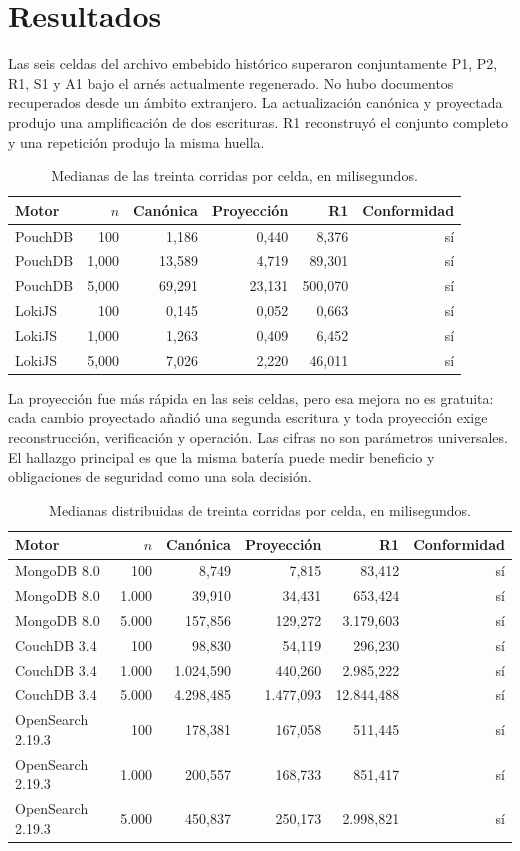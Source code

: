\documentclass[11pt]{article}
\begin{document}
\section{Resultados}
Las seis celdas del archivo embebido histórico superaron conjuntamente P1, P2, R1, S1 y A1 bajo el arnés actualmente regenerado. No hubo documentos recuperados desde un ámbito extranjero. La actualización canónica y proyectada produjo una amplificación de dos escrituras. R1 reconstruyó el conjunto completo y una repetición produjo la misma huella.

\begin{table}[h]
\centering
\caption{Medianas de las treinta corridas por celda, en milisegundos.}
\begin{tabular}{lrrrrr}
\toprule Motor & $n$ & Canónica & Proyección & R1 & Conformidad\\ \midrule
PouchDB & 100 & 1,186 & 0,440 & 8,376 & sí\\
PouchDB & 1,000 & 13,589 & 4,719 & 89,301 & sí\\
PouchDB & 5,000 & 69,291 & 23,131 & 500,070 & sí\\
LokiJS & 100 & 0,145 & 0,052 & 0,663 & sí\\
LokiJS & 1,000 & 1,263 & 0,409 & 6,452 & sí\\
LokiJS & 5,000 & 7,026 & 2,220 & 46,011 & sí\\ \bottomrule
\end{tabular}
\end{table}

La proyección fue más rápida en las seis celdas, pero esa mejora no es gratuita: cada cambio proyectado añadió una segunda escritura y toda proyección exige reconstrucción, verificación y operación. Las cifras no son parámetros universales. El hallazgo principal es que la misma batería puede medir beneficio y obligaciones de seguridad como una sola decisión.

\begin{table}[h]
\centering
\caption{Medianas distribuidas de treinta corridas por celda, en milisegundos.}
\begin{tabular}{lrrrrr}
\toprule Motor & $n$ & Canónica & Proyección & R1 & Conformidad\\ \midrule
MongoDB 8.0 & 100 & 8,749 & 7,815 & 83,412 & sí\\
MongoDB 8.0 & 1.000 & 39,910 & 34,431 & 653,424 & sí\\
MongoDB 8.0 & 5.000 & 157,856 & 129,272 & 3.179,603 & sí\\
CouchDB 3.4 & 100 & 98,830 & 54,119 & 296,230 & sí\\
CouchDB 3.4 & 1.000 & 1.024,590 & 440,260 & 2.985,222 & sí\\
CouchDB 3.4 & 5.000 & 4.298,485 & 1.477,093 & 12.844,488 & sí\\
OpenSearch 2.19.3 & 100 & 178,381 & 167,058 & 511,445 & sí\\
OpenSearch 2.19.3 & 1.000 & 200,557 & 168,733 & 851,417 & sí\\
OpenSearch 2.19.3 & 5.000 & 450,837 & 250,173 & 2.998,821 & sí\\ \bottomrule
\end{tabular}
\end{table}
\end{document}
